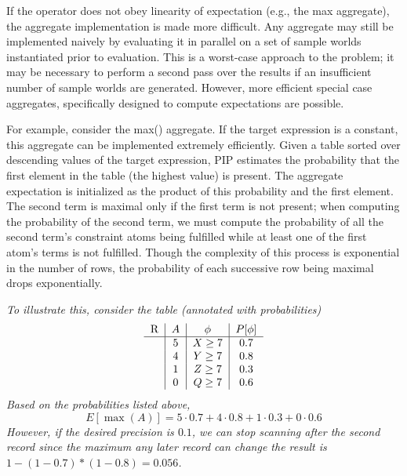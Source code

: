 If the operator does not obey linearity of expectation (e.g., the max aggregate), the aggregate implementation is made more difficult.  Any aggregate may still be implemented naively by evaluating it in parallel on a set of sample worlds instantiated prior to evaluation.  This is a worst-case approach to the problem; it may be necessary to perform a second pass over the results if an insufficient number of sample worlds are generated.  However, more efficient special case aggregates, specifically designed to compute expectations are possible.


For example, consider the max() aggregate.  If the target expression is a constant, this aggregate can be implemented extremely efficiently.  Given a table sorted over descending values of the target expression, PIP estimates the probability that the first element in the table (the highest value) is present.  The aggregate expectation is initialized as the product of this probability and the first element.  The second term is maximal only if the first term is not present; when computing the probability of the second term, we must compute the probability of all the second term's constraint atoms being fulfilled while at least one of the first atom's terms is not fulfilled.  Though the complexity of this process is exponential in the number of rows, the probability of each successive row being maximal drops exponentially.  

\begin{example}\em
To illustrate this, consider the table (annotated with probabilities)
\[
\begin{tabular}{c|c|c|c}
R & $A$ & $\phi$ & $P[\phi]$\\
\hline
& 5 & $X \ge 7$ & 0.7 \\
& 4 & $Y \ge 7$ & 0.8  \\
& 1 & $Z \ge 7$ & 0.3  \\
& 0 & $Q \ge 7$ & 0.6  \\
\end{tabular}
\]
Based on the probabilities listed above,
$$E[\max(A)] = 5 \cdot 0.7 + 4 \cdot 0.8 + 1 \cdot 0.3 + 0 \cdot 0.6$$
However, if the desired precision is $0.1$, we can stop scanning after the second record since the maximum any later record can change the result is $1-(1-0.7)*(1-0.8) = 0.056$.

\end{example}







